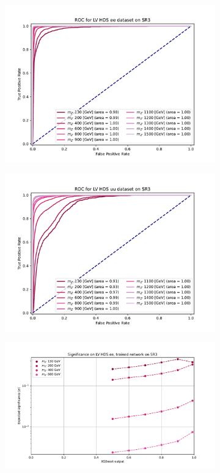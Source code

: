 \documentclass[12pt, a4paper]{book}
\begin{document}
\begin{figure}[!ht]
\begin{subfigure}[b]{0.49\textwidth}
      \includegraphics[width=1\textwidth]{XGBoost/Model_independent/150/LV_HDS/ROC_ee.pdf}
   \end{subfigure}
   \hfill
   \begin{subfigure}[b]{0.49\textwidth}
      \centering
      \includegraphics[width=1\textwidth]{XGBoost/Model_independent/150/LV_HDS/ROC_uu.pdf}
   \end{subfigure}
   \hfill
	\begin{subfigure}[b]{0.49\textwidth}
      \centering
      \includegraphics[width=1\textwidth]{XGBoost/Model_independent/150/LV_HDS/EXP_SIG_ee.pdf}

\end{subfigure}
\end{figure}
\end{document}
